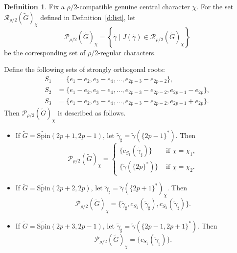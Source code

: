 \documentclass{amsart}
\newcommand{\Spin}{{\mathrm{Spin}}}
\theoremstyle{definition}
\newtheorem{definition}[thm]{Definition}
\newcommand{\tu}{\widetilde}
\begin{document}
\begin{definition} \label{d:param}
Fix a \(\rho/2\)-compatible genuine central character \(\chi\).
For the set
\(\mathcal R_{\rho/2}(\widetilde G)_\chi\)
defined in Definition~\ref{d:list}, let
\[
\mathcal P_{\rho/2}(\widetilde G)_\chi
=
\left\{
\widetilde\gamma \mid
J(\widetilde\gamma)
\in
\mathcal R_{\rho/2}(\widetilde G)_\chi
\right\}
\]
be the corresponding set of \(\rho/2\)-regular characters.

Define the following sets of strongly orthogonal roots:
\begin{align*}
S_1 &=\{e_1-e_2, e_3-e_4, \dots, e_{2p-3}-e_{2p-2}\},\\
S_2 &=\{e_1-e_2, e_3-e_4, \dots, e_{2p-3}-e_{2p-2}, e_{2p-1}-e_{2p}\},\\
S_3 &=\{e_1-e_2, e_3-e_4, \dots, e_{2p-3}-e_{2p-2}, e_{2p-1}+e_{2p}\}.
\end{align*}
 Then $\mathcal P_{\rho/2}(\tu G)_\chi$ is described as follows.

\begin{itemize}
    \item[(a)] If $\tu G=\tu\Spin (2p+1,2p-1)$, let $\tu\gamma_\sharp =\tu \gamma(\{2p-1\}^*)$. Then  
    $$\mathcal P_{\rho/2}(\tu G)_\chi=
    \begin{cases}
        \{c_{S_1}(\tu\gamma_\sharp)\} & \text{ if } \chi = \chi_1, \\ \{\tu\gamma(\{2p\}^*)\} & \text{ if } \chi=\chi_2.
      \end{cases}
    $$
  \item[(b)] If $\tu G=\tu\Spin (2p+2,2p)$,
  let  $\tu\gamma_\sharp= \tu\gamma(\{2p+1\}^*)_\chi$. Then 
    $$\mathcal P_{\rho/2}(\tu G)_\chi=\{\tu \gamma_\sharp, c_{S_2}(\tu \gamma_\sharp), c_{S_3}(\tu \gamma_\sharp)\}.$$
    \item[(c)] If $\tu G=\tu\Spin (2p+3,2p-1)$, let $\tu\gamma_\sharp =\tu \gamma(\{2p-1, 2p+1\}^*)$. Then 
    $$\mathcal P_{\rho/2}(\tu G)_\chi=\{c_{S_1}(\tu\gamma_\sharp)\}.$$
\end{itemize}


\end{definition}
\end{document}
